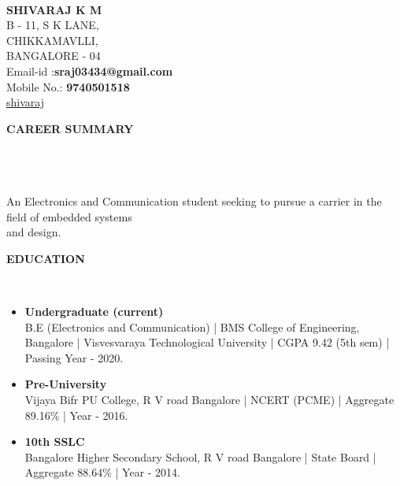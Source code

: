 \documentclass[a4paper,10pt]{article}
\newcommand{\lsep}{-0.5cm}
\newcommand{\resheading}[1]{{\small \colorbox{mygrey}{\begin{minipage}{0.975\textwidth}{\textbf{#1 \vphantom{p\^{E}}}}\end{minipage}}}}
\begin{document}
\hspace{0.5cm}\\[-0.2cm]



\textbf{SHIVARAJ K M} \\ 
\indent B - 11, S K LANE, \\
\indent CHIKKAMAVLLI,\\
\indent BANGALORE - 04\\
\indent Email-id :\textbf{sraj03434@gmail.com} \\
\indent Mobile No.: \textbf{9740501518} \\
\indent\faGithub\href{https://github.com/shiva-raj-km}{shivaraj}\hfill 
{}

\resheading{\textbf{CAREER SUMMARY} }\\[\lsep]\\ \\
\indent An Electronics and Communication student seeking to pursue a carrier in the field of embedded systems\\ \indent and design.\\

\resheading{\textbf{EDUCATION} }\\[\lsep]
\begin{itemize}
\item \noindent \textbf{Undergraduate (current)}\\
\indent B.E (Electronics and Communication) | BMS College of Engineering, Bangalore | Visvesvaraya Technological University | CGPA 9.42 (5th sem) | Passing Year - 2020.

\item \noindent \textbf{Pre-University}\\
\indent Vijaya Bifr PU College, R V road Bangalore | NCERT (PCME) | Aggregate 89.16\% | Year - 2016.

\item \noindent \textbf{10th SSLC}\\
\indent Bangalore Higher Secondary School, R V road Bangalore | State Board | Aggregate 88.64\% | Year - 2014.
\end{itemize}
\end{document}
